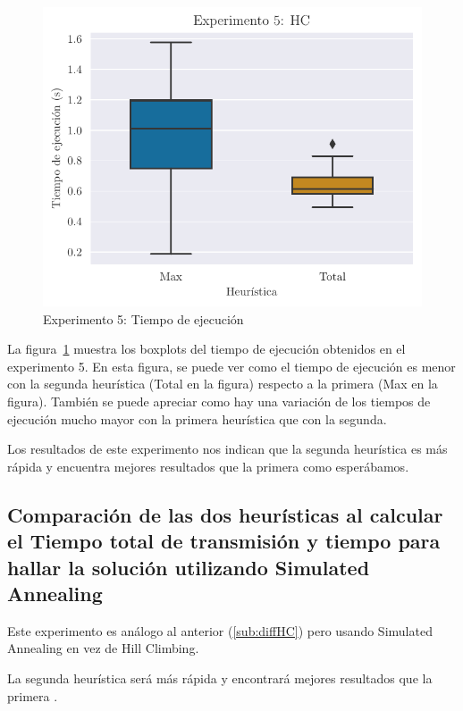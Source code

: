 \begin{figure}[H]
    \centering
    \includegraphics{include/plots/ex5_time_bplot.pdf}
    \caption{Experimento 5: Tiempo de ejecución}%
    \label{fig:ex5time}
\end{figure}

La figura~\ref{fig:ex5time} muestra los boxplots del tiempo de ejecución obtenidos en el experimento 5.
En esta figura, se puede ver como el tiempo de ejecución es menor con la segunda heurística (Total en la
figura) respecto a la primera (Max en la figura).
También se puede apreciar como hay una variación de los tiempos de ejecución mucho mayor con la primera
heurística que con la segunda.

Los resultados de este experimento nos indican que la segunda heurística es más rápida y encuentra mejores
resultados que la primera como esperábamos.

\pagebreak
\subsection{Comparación de las dos heurísticas al calcular el Tiempo total de transmisión y tiempo para hallar la solución utilizando Simulated Annealing}%
\label{sub:exp6}

Este experimento es análogo al anterior (\ref{sub:diffHC}) pero usando Simulated Annealing en vez de Hill Climbing.

\begin{hyp*}
La segunda heurística será más rápida y encontrará mejores resultados que la primera .
\end{hyp*}

